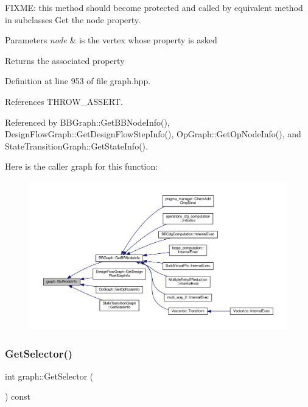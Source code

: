 F\+I\+X\+ME\+: this method should become protected and called by equivalent method in subclasses Get the node property. 


\begin{DoxyParams}{Parameters}
{\em node} & is the vertex whose property is asked \\
\hline
\end{DoxyParams}
\begin{DoxyReturn}{Returns}
the associated property 
\end{DoxyReturn}


Definition at line 953 of file graph.\+hpp.



References T\+H\+R\+O\+W\+\_\+\+A\+S\+S\+E\+RT.



Referenced by B\+B\+Graph\+::\+Get\+B\+B\+Node\+Info(), Design\+Flow\+Graph\+::\+Get\+Design\+Flow\+Step\+Info(), Op\+Graph\+::\+Get\+Op\+Node\+Info(), and State\+Transition\+Graph\+::\+Get\+State\+Info().

Here is the caller graph for this function\+:
\nopagebreak
\begin{figure}[H]
\begin{center}
\leavevmode
\includegraphics[width=350pt]{d5/d15/structgraph_a5c0638bd03bcc6491a7751354af7ea7e_icgraph}
\end{center}
\end{figure}
\mbox{\label{structgraph_a057f3ce254542cbe465949b1bb9c08c1}} 
\subsubsection{\texorpdfstring{Get\+Selector()}{GetSelector()}\hspace{0.1cm}{\footnotesize\ttfamily [1/3]}}
{\footnotesize\ttfamily int graph\+::\+Get\+Selector (\begin{DoxyParamCaption}{ }\end{DoxyParamCaption}) const\hspace{0.3cm}{\ttfamily [inline]}}




